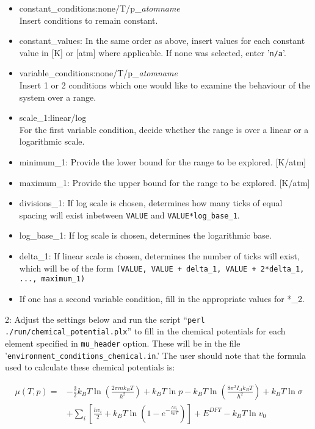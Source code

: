\begin{itemize}

\item constant\_conditions:none/T/p\_{\em atomname}\\
Insert conditions to remain constant.
\item constant\_values: In the same order as above, insert values for each constant value in [K] or [atm] where applicable. If none was selected, enter '\texttt{n/a}'.
\item variable\_conditions:none/T/p\_{\em atomname}\\
Insert 1 or 2 conditions which one would like to examine the behaviour of the system over a range.

\item scale\_1:linear/log\\
For the first variable condition, decide whether the range is over a linear or a logarithmic scale.
\item minimum\_1: Provide the lower bound for the range to be explored. [K/atm]
\item maximum\_1: Provide the upper bound for the range to be explored. [K/atm]
\item divisions\_1: If log scale is chosen, determines how many ticks of equal spacing will exist inbetween \texttt{VALUE} and \texttt{VALUE*log\_base\_1}.
\item log\_base\_1: If log scale is chosen, determines the logarithmic base.
\item delta\_1: If linear scale is chosen, determines the number of ticks will exist, which will be of the form \texttt{(VALUE, VALUE + delta\_1, VALUE + 2*delta\_1, ..., maximum\_1)}

\item If one has a second variable condition, fill in the appropriate values for *\_2.

\end{itemize}

2: Adjust the settings below and run the script ``\texttt{perl ./run/chemical\_potential.plx}'' to fill in the chemical potentials for each element specified in \texttt{mu\_header} option. These will be in the file '\texttt{environment\_conditions\_chemical.in}.' The user should note that the formula used to calculate these chemical potentials is:

\begin{align*}
\mu(T,p) = &-\frac{3}{2}k_{B}T\ln\left(\frac{2{\pi}mk_{B}T}{h^{2}}\right) + k_{B}T\ln p
-k_{B}T\ln\left(\frac{8{\pi^{2}}I_{A}k_{B}T}{h^{2}}\right) + k_{B}T\ln\sigma\\
&+ \sum_{i}^{} \left[\frac{hv_{i}}{2} + k_{B}T\ln\left(1 - e^{-\frac{hv_{i}}{k_{B}T}}\right)\right]
+ E^{DFT} - k_{B}T\ln v_{0}\\
\end{align*}

